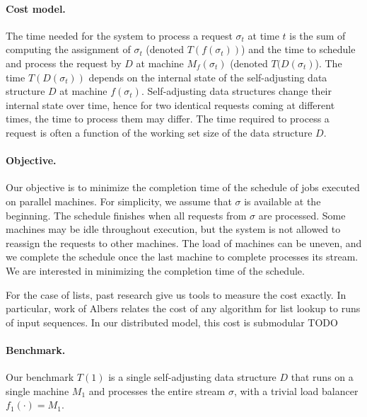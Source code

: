 \paragraph{Cost model.}

The time needed for the system to process a request $\sigma_t$ at time $t$ is the sum of computing the assignment of $\sigma_t$ (denoted $T(f(\sigma_t))$) and the time to schedule and process the request by $D$ at machine $M_f(\sigma_t)$ (denoted $T(D(\sigma_t)$).
The time $T(D(\sigma_t))$ depends on the internal state of the self-adjusting data structure $D$ at machine $f(\sigma_t)$.
Self-adjusting data structures change their internal state over time, hence for two identical requests coming at different times, the time to process them may differ.
The time required to process a request is often a function of the working set size of the data structure $D$. 


\paragraph*{Objective.}
Our objective is to minimize the completion time of the schedule of jobs executed on parallel machines.
For simplicity, we assume that $\sigma$ is available at the beginning. 
The schedule finishes when all requests from $\sigma$ are processed. Some machines may be idle throughout execution, but the system is not allowed to reassign the requests to other machines. The load of machines can be uneven, and we complete the schedule once the last machine to complete processes its stream.
We are interested in minimizing the completion time of the schedule.


For the case of lists, past research give us tools to measure the cost exactly. In particular, work of Albers relates the cost of any algorithm for list lookup to runs of input sequences.
In our distributed model, this cost is submodular TODO



\paragraph*{Benchmark.}
Our benchmark $T(1)$ is a single self-adjusting data structure $D$ that runs on a single machine $M_1$
and processes the entire stream $\sigma$, with a trivial load balancer $f_1(\cdot) = M_1$.


